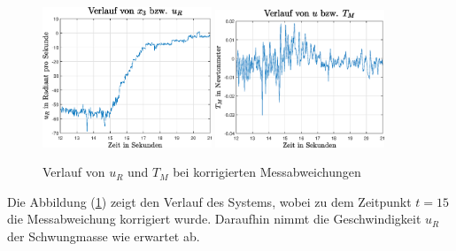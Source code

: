 \begin{figure}[!ht]\ContinuedFloat
\centering
\includegraphics[width=0.45\textwidth]{img/edge_exp2_ur.eps}\hspace{0.7cm}
\includegraphics[width=0.45\textwidth]{img/edge_exp2_tm.eps}
\caption{Verlauf von $u_R$ und $T_M$ bei korrigierten Messabweichungen}
\label{plot2_edge_exp2}
\end{figure}
\newpage
Die Abbildung (\ref{plot2_edge_exp2}) zeigt den Verlauf des Systems, wobei zu dem Zeitpunkt $t=15$ die Messabweichung korrigiert wurde. Daraufhin nimmt die Geschwindigkeit $u_R$ der Schwungmasse wie erwartet ab.
